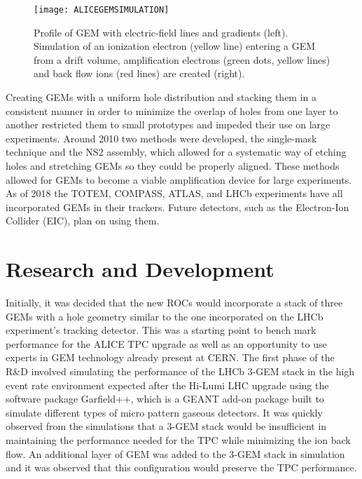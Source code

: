 \begin{figure}[t!]
\texttt{[image: ALICEGEMSIMULATION]}
\centering
\caption{Profile of GEM with electric-field lines and gradients (left).  Simulation of an ionization electron (yellow line) entering a GEM from a drift volume, amplification electrons (green dots, yellow lines) and back flow ions (red lines) are created (right)\cite{Bhattacharya:2017yaj}.}
\label{fig:GEMefield}
\end{figure}

Creating GEMs with a uniform hole distribution and stacking them in a consistent manner in order to minimize the overlap of holes from one layer to another restricted them to small prototypes and impeded their use on large experiments.  Around 2010 two methods were developed, the single-mask technique\cite{0960-1317-17-8-021} and the NS2 assembly\cite{1748-0221-12-06-C06036}, which allowed for a systematic way of etching holes and stretching GEMs so they could be properly aligned.  These methods allowed for GEMs to become a viable amplification device for large experiments.  As of 2018 the TOTEM, COMPASS, ATLAS, and LHCb experiments have all incorporated GEMs in their trackers.  Future detectors, such as the Electron-Ion Collider (EIC), plan on using them\cite{SAULI20162}.


\section{Research and Development}

Initially, it was decided that the new ROCs would incorporate a stack of three GEMs with a hole geometry similar to the one incorporated on the LHCb experiment's\cite{Santimaria:1690550} tracking detector.  This was a starting point to bench mark performance for the ALICE TPC upgrade as well as an opportunity to use experts in GEM technology already present at CERN.  The first phase of the R\&D involved simulating the performance of the LHCb 3-GEM stack in the high event rate environment expected  after the Hi-Lumi LHC upgrade using the software package Garfield++\cite{PFEIFFER2019121}, which is a GEANT\cite{Agostinelli:2002hh} add-on package built to simulate different types of micro pattern gaseous detectors.  It was quickly observed from the simulations that a 3-GEM stack would be insufficient in maintaining the performance needed for the TPC while minimizing the ion back flow.  An additional layer of GEM was added to the 3-GEM stack in simulation and it was observed that this configuration would preserve the TPC performance.

